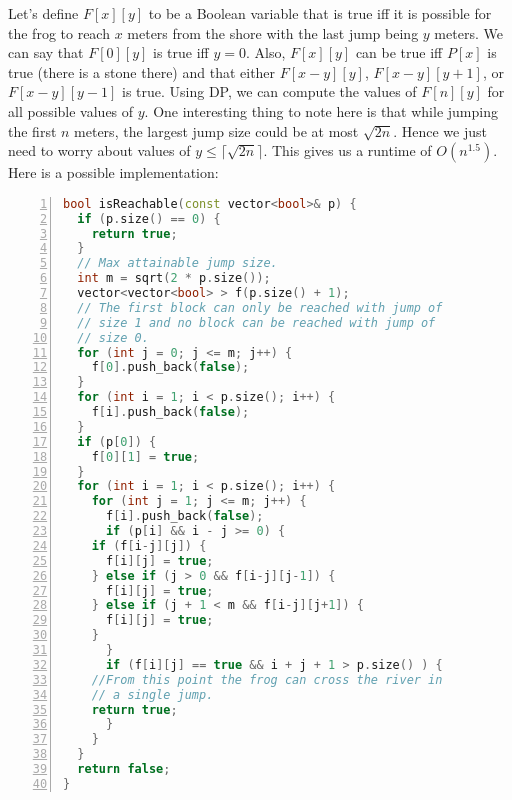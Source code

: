 Let's define $F[x][y]$ to be a Boolean variable that is true iff it is
possible for the frog to reach $x$ meters from the shore with the last
jump being $y$ meters. We can say that $F[0][y]$ is true iff $y=0$. Also,
$F[x][y]$ can be true iff $P[x]$ is true (there is a stone there) and 
that either $F[x-y][y]$,  $F[x-y][y+1]$, or $F[x-y][y-1]$ is true.
Using DP, we can compute the values of $F[n][y]$ for
all possible values of $y$. One interesting thing to note here is that
while jumping the first $n$ meters, the largest jump size could be at most
$\sqrt{2n}$. Hence we just need to worry about values of $y \le
\lceil \sqrt{2n} \rceil $.  This gives us a runtime of $O(n^{1.5})$. Here is a
possible implementation:
\begin{lstlisting}[basicstyle=\footnotesize,numbers=left,breaklines=true,language=C++]
bool isReachable(const vector<bool>& p) {
  if (p.size() == 0) {
    return true;
  }
  // Max attainable jump size.
  int m = sqrt(2 * p.size());
  vector<vector<bool> > f(p.size() + 1);
  // The first block can only be reached with jump of
  // size 1 and no block can be reached with jump of
  // size 0.
  for (int j = 0; j <= m; j++) {
    f[0].push_back(false);
  }
  for (int i = 1; i < p.size(); i++) {
    f[i].push_back(false);
  }
  if (p[0]) {
    f[0][1] = true;
  }
  for (int i = 1; i < p.size(); i++) {
    for (int j = 1; j <= m; j++) {
      f[i].push_back(false);
      if (p[i] && i - j >= 0) {
	if (f[i-j][j]) {
	  f[i][j] = true;
	} else if (j > 0 && f[i-j][j-1]) {
	  f[i][j] = true;
	} else if (j + 1 < m && f[i-j][j+1]) {
	  f[i][j] = true;
	} 
      }
      if (f[i][j] == true && i + j + 1 > p.size() ) {
	//From this point the frog can cross the river in
	// a single jump.
	return true;
      }
    }
  }
  return false;
}

\end{lstlisting}



